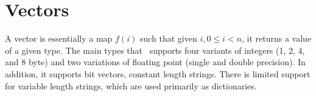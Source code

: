 \section{Vectors}
\label{vectors}

A vector is essentially a map \(f(i)\) such that given \(i, 0 \leq i < n\), it
returns a value of a given type. The main types that \Q\ supports four variants
of integers (1, 2, 4, and 8 byte) and two variations of floating point (single
and double precision). In addition, it supports bit vectors, constant length
strings. There is limited support for variable length strings, which are used
primarily as dictionaries.







